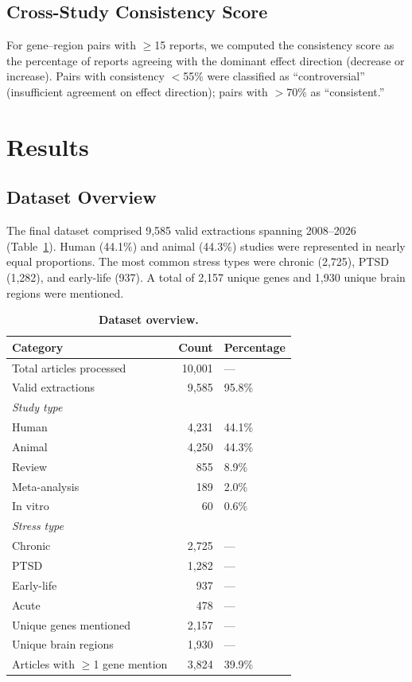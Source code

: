 \documentclass[12pt,a4paper]{article}
\begin{document}
\subsection{Cross-Study Consistency Score}

For gene--region pairs with $\geq$15 reports, we computed the consistency score as the percentage of reports agreeing with the dominant effect direction (decrease or increase). Pairs with consistency $<$55\% were classified as ``controversial'' (insufficient agreement on effect direction); pairs with $>$70\% as ``consistent.''

\section{Results}

\subsection{Dataset Overview}

The final dataset comprised 9,585 valid extractions spanning 2008--2026 (Table~\ref{tab:overview}). Human (44.1\%) and animal (44.3\%) studies were represented in nearly equal proportions. The most common stress types were chronic (2,725), PTSD (1,282), and early-life (937). A total of 2,157 unique genes and 1,930 unique brain regions were mentioned.

\begin{table}[H]
\centering
\caption{\textbf{Dataset overview.}}
\label{tab:overview}
\begin{tabular}{lrl}
\toprule
\textbf{Category} & \textbf{Count} & \textbf{Percentage} \\
\midrule
Total articles processed & 10,001 & --- \\
Valid extractions & 9,585 & 95.8\% \\
\midrule
\textit{Study type} & & \\
\quad Human & 4,231 & 44.1\% \\
\quad Animal & 4,250 & 44.3\% \\
\quad Review & 855 & 8.9\% \\
\quad Meta-analysis & 189 & 2.0\% \\
\quad In vitro & 60 & 0.6\% \\
\midrule
\textit{Stress type} & & \\
\quad Chronic & 2,725 & --- \\
\quad PTSD & 1,282 & --- \\
\quad Early-life & 937 & --- \\
\quad Acute & 478 & --- \\
\midrule
Unique genes mentioned & 2,157 & --- \\
Unique brain regions & 1,930 & --- \\
Articles with $\geq$1 gene mention & 3,824 & 39.9\% \\
\bottomrule
\end{tabular}
\end{table}
\end{document}
